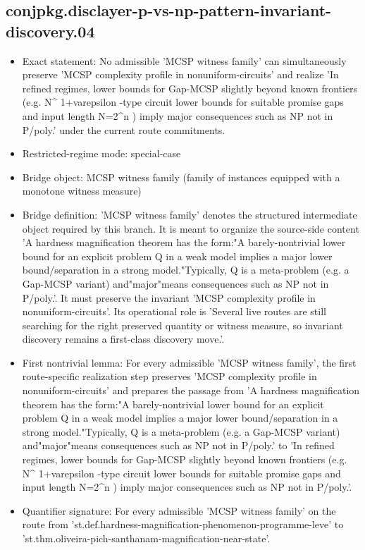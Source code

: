 \documentclass[11pt]{article}
\begin{document}
\subsection*{conjpkg.disclayer-p-vs-np-pattern-invariant-discovery.04}
\begin{itemize}
\item Exact statement: No admissible 'MCSP witness family' can simultaneously preserve 'MCSP complexity profile in nonuniform-circuits' and realize 'In refined regimes, lower bounds for Gap-MCSP slightly beyond known frontiers (e.g. N\textasciicircum{} 1+varepsilon -type circuit lower bounds for suitable promise gaps and input length N=2\textasciicircum{}n ) imply major consequences such as NP not in P/poly.' under the current route commitments.
\item Restricted-regime mode: special-case
\item Bridge object: MCSP witness family (family of instances equipped with a monotone witness measure)
\item Bridge definition: 'MCSP witness family' denotes the structured intermediate object required by this branch. It is meant to organize the source-side content 'A hardness magnification theorem has the form:"A barely-nontrivial lower bound for an explicit problem Q in a weak model implies a major lower bound/separation in a strong model."Typically, Q is a meta-problem (e.g. a Gap-MCSP variant) and"major"means consequences such as NP not in P/poly.'. It must preserve the invariant 'MCSP complexity profile in nonuniform-circuits'. Its operational role is 'Several live routes are still searching for the right preserved quantity or witness measure, so invariant discovery remains a first-class discovery move.'.
\item First nontrivial lemma: For every admissible 'MCSP witness family', the first route-specific realization step preserves 'MCSP complexity profile in nonuniform-circuits' and prepares the passage from 'A hardness magnification theorem has the form:"A barely-nontrivial lower bound for an explicit problem Q in a weak model implies a major lower bound/separation in a strong model."Typically, Q is a meta-problem (e.g. a Gap-MCSP variant) and"major"means consequences such as NP not in P/poly.' to 'In refined regimes, lower bounds for Gap-MCSP slightly beyond known frontiers (e.g. N\textasciicircum{} 1+varepsilon -type circuit lower bounds for suitable promise gaps and input length N=2\textasciicircum{}n ) imply major consequences such as NP not in P/poly.'.
\item Quantifier signature: For every admissible 'MCSP witness family' on the route from 'st.def.hardness-magnification-phenomenon-programme-leve' to 'st.thm.oliveira-pich-santhanam-magnification-near-state'.

\end{itemize}
\end{document}
